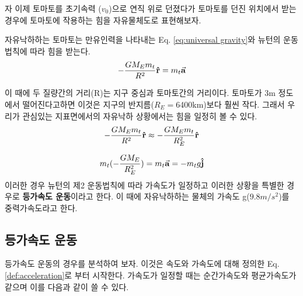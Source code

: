  자 이제 토마토를 초기속력 ($v_0$)으로 연직 위로 던졌다가 토마토를 던진 위치에서 
받는 경우에 토마토에 작용하는 힘을 자유물체도로 표현해보자.
\clearpage

 
 \begin{flushleft}
 자유낙하하는 토마토는 만유인력을 나타내는 Eq. \ref{eq:universal gravity}와 뉴턴의 운동 법칙에 따라 힘을 받는다.
    \begin{equation}
        -\frac{GM_{E}m_{t}}{R^2}\vu{r}=m_{t}\va{a}
    \end{equation}
  

    
    이 때에 두 질량간의 거리(R)는 지구 중심과 토마토간의 거리이다. 토마토가 3m 정도에서 떨어진다고하면 이것은 지구의 반지름($R_E=$6400km)보다 훨씬 작다. 그래서
우리가 관심있는 지표면에서의 자유낙하 상황에서는 힘을 일정히 볼 수 있다.
    \begin{equation}
        -\frac{GM_{E}m_{t}}{R^2}\vu{r}\approx {-\frac{GM_{E}m_{t}}{R_{E}^2}}\vu{r} 
    \end{equation}

    \begin{equation}
      m_{t}({-\frac{GM_{E}}{R_{E}^2}}) =m_{t}\va{a} =-m_{t}g \vu{j}
    \end{equation}
     이러한 경우 뉴턴의 제2 운동법칙에 따라 
 가속도가 일정하고 이러한 상황을 특별한 경우로 \textbf{등가속도 운동}이라고 한다.
    이 때에 자유낙하하는 물체의 가속도 g($9.8m/s^2$)를 중력가속도라고 한다.
    
    \subsection{등가속도 운동}
    등가속도 운동의 경우를 분석하여 보자. 이것은 속도와 가속도에 대해 정의한 Eq.\ref{def:acceleration}로 부터 시작한다. 
    가속도가 일정할 때는 순간가속도와 평균가속도가 같으며 이를 다음과 같이 쓸 수 있다. 
    

\end{flushleft}
